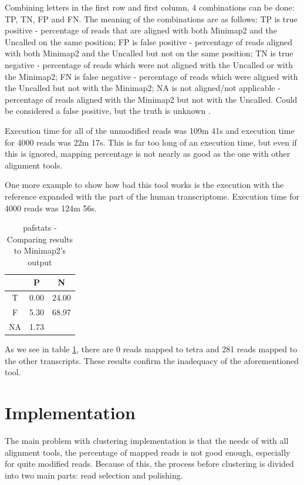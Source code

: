 \documentclass[times, utf8, zavrsni, numeric]{fer}
\begin{document}
Combining letters in the first row and first column, 4 combinations can be done: TP, TN, FP and FN.
The meaning of the combinations are as follows: TP is true positive - percentage of reads that are aligned 
with both Minimap2 and the Uncalled on the same position; FP is false positive - percentage of reads aligned with
both Minimap2 and the Uncalled but not on the same position; TN is true negative - percentage of reads which were not aligned with
the Uncalled or with the Minimap2; FN is false negative - percentage of reads which were aligned with the Uncalled
but not with the Minimap2; NA is not aligned/not applicable - percentage of reads aligned with the Minimap2
but not with the Uncalled. Could be considered a false positive, but the truth is unknown \cite{uncalled}.

Execution time for all of the unmodified reads was 109m 41s and execution time for 4000 reads was 22m 17s. 
This is far too long of an execution time, but even if this is ignored, mapping percentage is not nearly as 
good as the one with other alignment tools. 

One more example to show how bad this tool works is the execution with the reference expanded with the part of the human 
transcriptome. Execution time for 4000 reads was 124m 56s. 

\begin{table}[H]
    \caption{pafstats - Comparing results to Minimap2's output}
    \centering
    \label{pafstats2}
    {\begin{tabular}{ccc}
        & P & N \\ \hline
      T & 0.00 & 24.00 \\ \hline
      F & 5.30 & 68.97 \\ \hline
      NA & 1.73 & \\ \hline  
    \end{tabular}}
\end{table}

As we see in table \ref{pafstats2}, there are 0 reads mapped to tetra and 281 reads mapped to the other transcripts.
These results confirm the inadequacy of the aforementioned tool. 


\chapter{Implementation}
The main problem with clustering implementation is that  the needs of with all alignment tools, 
the percentage of mapped reads is not good enough, especially for quite modified reads. 
Because of this, the process before clustering is divided into two main parts: read selection
and polishing. 
\end{document}
